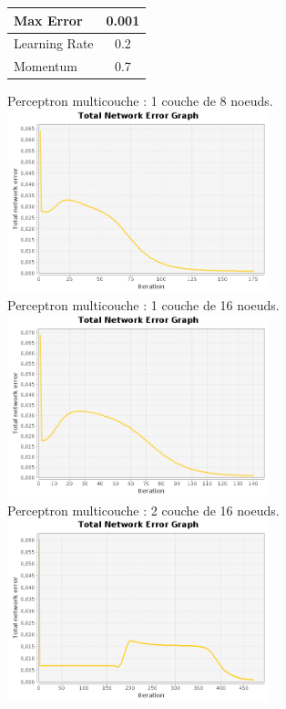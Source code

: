 \documentclass[10pt]{report}
\begin{document}
\begin{center}

\begin{tabular}{|l|c|}
	\hline
	Max Error & 0.001 \\
	\hline
	Learning Rate & 0.2 \\
	\hline
	Momentum & 0.7 \\
	\hline
\end{tabular}

Perceptron multicouche : 1 couche de 8 noeuds.\\
\includegraphics[height=200px]{img/SQUARE_8_101_-3.png}\\
Perceptron multicouche : 1 couche de 16 noeuds.\\
\includegraphics[height=200px]{img/SQUARE_16_101_-3.png}\\
Perceptron multicouche : 2 couche de 16 noeuds.\\
\includegraphics[height=200px]{img/SQUARE_16_16_101_-3.png}\\


\end{center}
\end{document}
